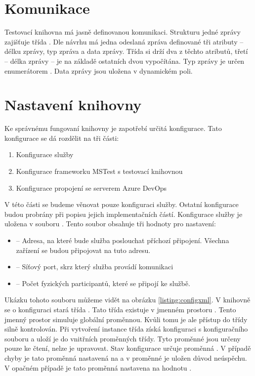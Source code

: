 \section{Komunikace}
Testovací knihovna má jasně definovanou komunikaci. Strukturu jedné zprávy zajišťuje třída . Dle návrhu má jedna odeslaná zpráva definované tři atributy -- délku zprávy, typ zpráva a data zprávy. Třída  si drží dva z těchto atributů, třetí -- délka zprávy -- je na základě ostatních dvou vypočítána. Typ zprávy je určen enumerátorem . Data zprávy jsou uložena v dynamickém poli. 


\section{Nastavení knihovny}
Ke správnému fungovaní knihovny je zapotřebí určitá konfigurace. Tato konfigurace se dá rozdělit na tři části:
\begin{enumerate}
    \item Konfigurace služby
    \item Konfigurace frameworku MSTest s testovací knihovnou
    \item Konfigurace propojení se serverem Azure DevOps
\end{enumerate}

V této části se budeme věnovat pouze konfiguraci služby. Ostatní konfigurace budou probrány při popisu jejich implementačních částí. Konfigurace služby je uložena v souboru . Tento soubor obsahuje tři hodnoty pro nastavení:

\begin{itemize}
    \item {} -- Adresa, na které bude služba poslouchat příchozí připojení. Všechna zařízení se budou připojovat na tuto adresu.
    \item {} -- Síťový port, skrz který služba provádí komunikaci
    \item {} -- Počet fyzických participantů, které se připojí ke službě.   
\end{itemize}

Ukázku tohoto souboru můžeme vidět na obrázku \ref{listing:configxml}. V knihovně se o konfiguraci stará třída . Tato třída existuje v jmenném prostoru . Tento jmenný prostor simuluje globální proměnnou. Kvůli tomu je ale přístup do třídy silně kontrolován. Při vytvoření instance třída získá konfiguraci s konfiguračního souboru a uloží je do vnitřních proměnných třídy. Tyto proměnné jsou určeny pouze ke čtení, nelze je upravovat. Stav konfigurace určuje proměnná . V případě chyby je tato proměnná nastavená na  a v proměnné  je uložen důvod neúspěchu. V opačném případě je tato proměnná nastavena na hodnotu .


